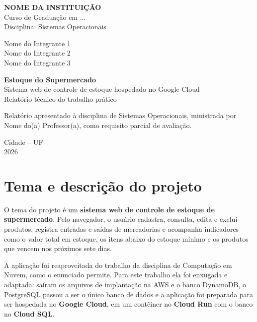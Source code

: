 \documentclass[12pt,a4paper]{article}
\newcommand{\instituicao}{NOME DA INSTITUIÇÃO}
\newcommand{\curso}{Curso de Graduação em ...}
\newcommand{\disciplina}{Sistemas Operacionais}
\newcommand{\professor}{Nome do(a) Professor(a)}
\newcommand{\integrantes}{%
  Nome do Integrante 1\\
  Nome do Integrante 2\\
  Nome do Integrante 3}
\newcommand{\cidade}{Cidade -- UF}
\newcommand{\ano}{2026}
\begin{document}
\begin{titlepage}
  \begin{center}
    {\large\bfseries \MakeUppercase{\instituicao}}\\[4pt]
    {\large \curso}\\[2pt]
    {\large Disciplina: \disciplina}

    \vspace{2.6cm}
    {\large \integrantes}

    \vfill
    {\LARGE\bfseries Estoque do Supermercado}\\[12pt]
    {\Large Sistema web de controle de estoque hospedado no Google Cloud}\\[16pt]
    {\large Relatório técnico do trabalho prático}

    \vfill
    \begin{flushright}
      \begin{minipage}{0.55\textwidth}
        \small\singlespacing
        Relatório apresentado à disciplina de \disciplina, ministrada por \professor,
        como requisito parcial de avaliação.
      \end{minipage}
    \end{flushright}

    \vspace{2cm}
    {\large \cidade}\\[2pt]
    {\large \ano}
  \end{center}
\end{titlepage}

\tableofcontents
\clearpage

\section{Tema e descrição do projeto}

O tema do projeto é um \textbf{sistema web de controle de estoque de supermercado}. Pelo
navegador, o usuário cadastra, consulta, edita e exclui produtos, registra entradas e saídas
de mercadorias e acompanha indicadores como o valor total em estoque, os itens abaixo do
estoque mínimo e os produtos que vencem nos próximos sete dias.

A aplicação foi reaproveitada do trabalho da disciplina de Computação em Nuvem, como o
enunciado permite. Para este trabalho ela foi enxugada e adaptada: saíram os arquivos de
implantação na AWS e o banco DynamoDB, o PostgreSQL passou a ser o único banco de dados e a
aplicação foi preparada para ser hospedada no \textbf{Google Cloud}, em um contêiner no
\textbf{Cloud Run} com o banco no \textbf{Cloud SQL}.
\end{document}
